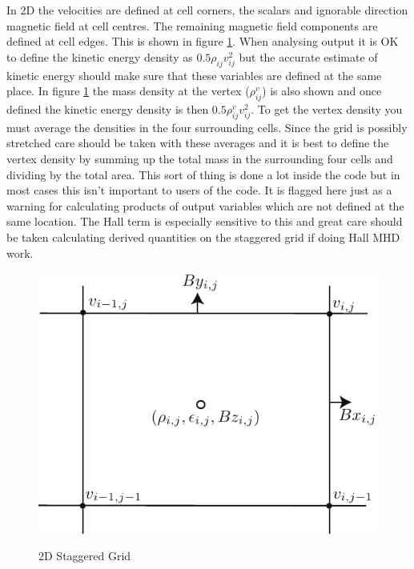\documentclass[11pt]{article}
\begin{document}
In 2D the velocities are defined at cell corners, the scalars and ignorable direction magnetic field at cell centres. The remaining magnetic field components are defined at cell edges. This is shown in figure \ref{2d-staggered}. When analysing output it is OK to define the kinetic energy density as $0.5\rho_{ij}v_{ij}^2$ but the accurate estimate of kinetic energy should make sure that these variables are defined at the same place. In figure \ref{2d-staggered} the mass density at the vertex ($\rho_{ij}^v$) is also shown and once defined the kinetic energy density is then  $0.5\rho_{ij}^v v_{ij}^2$. To get the vertex density you must average the densities in the four surrounding cells. Since the grid is possibly stretched care should be taken with these averages and it is best to define the vertex density by summing up the total mass in the surrounding four cells and dividing by the total area. This sort of thing is done a lot inside the code but in most cases this isn't important to users of the code. It is flagged here just as a warning for calculating products of output variables which are not defined at the same location. The Hall term is especially sensitive to this and great care should be taken calculating derived quantities on the staggered grid if doing Hall MHD work.

\begin{figure}
\begin{center}{\includegraphics{2d-staggered-grid.pdf}}\end{center}
\caption{2D Staggered Grid}
\label{2d-staggered}
\end{figure}
\end{document}
